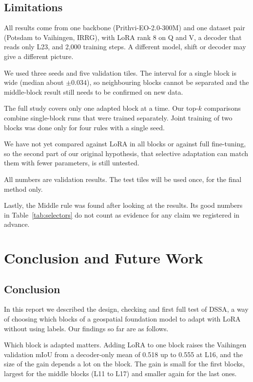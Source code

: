 \documentclass[11pt,a4paper]{report}
\begin{document}
\section{Limitations}

All results come from one backbone (Prithvi-EO-2.0-300M) and one dataset pair (Potsdam to Vaihingen, IRRG), with LoRA rank 8 on Q and V, a decoder that reads only L23, and 2,000 training steps. A different model, shift or decoder may give a different picture.

We used three seeds and five validation tiles. The interval for a single block is wide (median about $\pm 0.034$), so neighbouring blocks cannot be separated and the middle-block result still needs to be confirmed on new data.

The full study covers only one adapted block at a time. Our top-$k$ comparisons combine single-block runs that were trained separately. Joint training of two blocks was done only for four rules with a single seed.

We have not yet compared against LoRA in all blocks or against full fine-tuning, so the second part of our original hypothesis, that selective adaptation can match them with fewer parameters, is still untested.

All numbers are validation results. The test tiles will be used once, for the final method only.

Lastly, the Middle rule was found after looking at the results. Its good numbers in Table~\ref{tab:selectors} do not count as evidence for any claim we registered in advance.

\chapter{Conclusion and Future Work}
\label{ch:conclusion}

\section{Conclusion}

In this report we described the design, checking and first full test of DSSA, a way of choosing which blocks of a geospatial foundation model to adapt with LoRA without using labels. Our findings so far are as follows.

Which block is adapted matters. Adding LoRA to one block raises the Vaihingen validation mIoU from a decoder-only mean of 0.518 up to 0.555 at L16, and the size of the gain depends a lot on the block. The gain is small for the first blocks, largest for the middle blocks (L11 to L17) and smaller again for the last ones.
\end{document}
